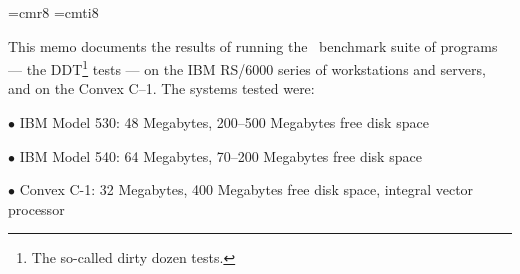 \font\eightrm=cmr8			%
\font\eightit=cmti8			%

\def\author{Patrick P.~Murphy}
\def\revisors{}
\def\mdate{April 8, 1991}
\def\ftitle{A Comparison of DDT results}
\def\ftitlemore{IBM RS/6000 and Convex C--1}
\def\stitle{DDT Results: IBM RS/6000 and Convex C--1}
\def\memnumb{7} \def\memnumc{1} %

\memobegin


This memo documents the results of running the \AIPS\ benchmark suite
of programs --- the DDT\footnote*{\eightrm The
so-called {\eightit dirty dozen tests\/}.} tests --- on the IBM RS/6000
series of workstations and servers, and on the Convex C--1.  The
systems tested were:\medskip

\item{$\bullet$} IBM Model 530: 48 Megabytes, 200--500 Megabytes free disk space
\item{$\bullet$} IBM Model 540: 64 Megabytes, 70--200 Megabytes free disk space
\item{$\bullet$} Convex C-1: 32 Megabytes, 400 Megabytes free disk space,
	integral vector processor
\medskip

